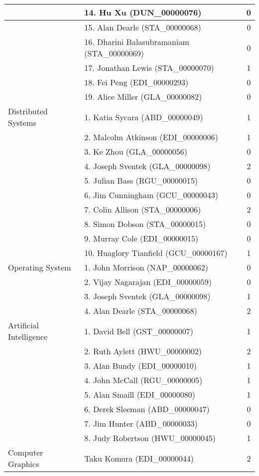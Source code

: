 \begin{longtable}{|l|l|c|}
\hline  & 14. Hu Xu (DUN\_00000076) & 0 \\
\hline  & 15. Alan Dearle (STA\_00000068) & 0 \\
\hline  & 16. Dharini Balasubramaniam (STA\_00000069) & 0 \\
\hline  & 17. Jonathan Lewis (STA\_00000070) & 1 \\
\hline  & 18. Fei Peng (EDI\_00000293) & 0 \\
\hline  & 19. Alice Miller (GLA\_00000082) & 0 \\
\hline Distributed Systems & 1. Katia Sycara (ABD\_00000049) & 1 \\
\hline  & 2. Malcolm Atkinson (EDI\_00000006) & 1 \\
\hline  & 3. Ke Zhou (GLA\_00000056) & 0 \\
\hline  & 4. Joseph Sventek (GLA\_00000098) & 2 \\
\hline  & 5. Julian Bass (RGU\_00000015) & 0 \\
\hline  & 6. Jim Cunningham (GCU\_00000043) & 0 \\
\hline  & 7. Colin Allison (STA\_00000006) & 2 \\
\hline  & 8. Simon Dobson (STA\_00000015) & 0 \\
\hline  & 9. Murray Cole (EDI\_00000015) & 0 \\
\hline  & 10. Huaglory Tianfield (GCU\_00000167) & 1 \\
\hline Operating System & 1. John Morrison (NAP\_00000062) & 0 \\
\hline  & 2. Vijay Nagarajan (EDI\_00000059) & 0 \\
\hline  & 3. Joseph Sventek (GLA\_00000098) & 1 \\
\hline  & 4. Alan Dearle (STA\_00000068) & 2 \\
\hline Artificial Intelligence & 1. David Bell (GST\_00000007) & 1 \\
\hline  & 2. Ruth Aylett (HWU\_00000002) & 2 \\
\hline  & 3. Alan Bundy (EDI\_00000010) & 1 \\
\hline  & 4. John McCall (RGU\_00000005) & 1 \\
\hline  & 5. Alan Smaill (EDI\_00000080) & 1 \\
\hline  & 6. Derek Sleeman (ABD\_00000047) & 0 \\
\hline  & 7. Jim Hunter (ABD\_00000033) & 0 \\
\hline  & 8. Judy Robertson (HWU\_00000045) & 1 \\
\hline Computer Graphics & Taku Komura (EDI\_00000044) & 2 \\

\end{longtable}
